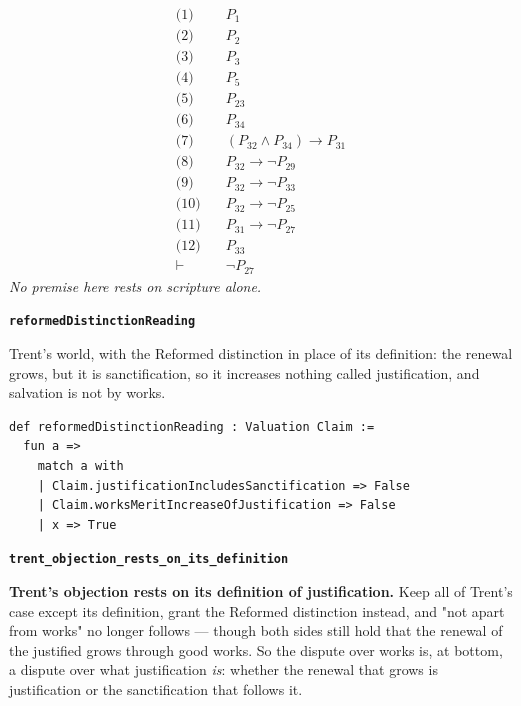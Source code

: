 \documentclass[11pt]{article}
\begin{document}
\begin{align*}
  \text{(1)} \quad & P_{1} \\
  \text{(2)} \quad & P_{2} \\
  \text{(3)} \quad & P_{3} \\
  \text{(4)} \quad & P_{5} \\
  \text{(5)} \quad & P_{23} \\
  \text{(6)} \quad & P_{34} \\
  \text{(7)} \quad & (P_{32} \land P_{34}) \rightarrow P_{31} \\
  \text{(8)} \quad & P_{32} \rightarrow \lnot P_{29} \\
  \text{(9)} \quad & P_{32} \rightarrow \lnot P_{33} \\
  \text{(10)} \quad & P_{32} \rightarrow \lnot P_{25} \\
  \text{(11)} \quad & P_{31} \rightarrow \lnot P_{27} \\
  \text{(12)} \quad & P_{33} \\
  \vdash \quad & \lnot P_{27}
\end{align*}
\emph{No premise here rests on scripture alone.}
\par\medskip\noindent\textbf{\texttt{reformed\allowbreak{}Distinction\allowbreak{}Reading}}\par\nobreak\noindent
Trent's world, with the Reformed distinction in place of its definition: the renewal grows, but it is sanctification, so it increases nothing called justification, and salvation is not by works.

{\small\begin{verbatim}
def reformedDistinctionReading : Valuation Claim :=
  fun a =>
    match a with
    | Claim.justificationIncludesSanctification => False
    | Claim.worksMeritIncreaseOfJustification => False
    | x => True
\end{verbatim}}
\par\medskip\noindent\textbf{\texttt{trent\_\allowbreak{}objection\_\allowbreak{}rests\_\allowbreak{}on\_\allowbreak{}its\_\allowbreak{}definition}}\par\nobreak\noindent
\textbf{Trent's objection rests on its definition of justification.} Keep all of Trent's case except its definition, grant the Reformed distinction instead, and "not apart from works" no longer follows — though both sides still hold that the renewal of the justified grows through good works. So the dispute over works is, at bottom, a dispute over what justification \emph{is}: whether the renewal that grows is justification or the sanctification that follows it.
\end{document}
